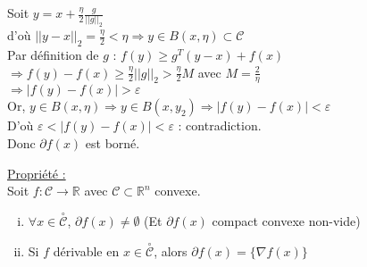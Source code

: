 \documentclass[12pt,a4paper]{article}
\begin{document}
Soit $y = x + \frac{\eta}{2} \frac{g}{||g||_2}$\\
d'où $||y - x||_2 = \frac{\eta}{2} < \eta \Rightarrow y \in B(x, \eta) \subset \mathcal{C}$\\

Par définition de $g$ : $f(y) \geq g^T(y - x) + f(x)$\\
$\Rightarrow f(y) - f(x) \geq \frac{\eta}{2} ||g||_2 > \frac{\eta}{2} M$ avec $M = \frac{2}{\eta}$\\
$\Rightarrow |f(y) - f(x)| > \varepsilon$\\

Or, $y \in B(x, \eta) \Rightarrow y \in B(x, y_2) \Rightarrow |f(y) - f(x)| < \varepsilon$\\

D'où $\varepsilon < |f(y) - f(x)| < \varepsilon$ : contradiction.\\

Donc $\partial f(x)$ est borné.\\

\color{black}

\underline{Propriété :}\\
Soit $f : \mathcal{C} \rightarrow \mathbb{R}$ avec $\mathcal{C} \subset \mathbb{R}^n$ convexe.
\begin{enumerate}[i)]
    \item $\forall x \in \overset{\circ}{\mathcal{C}}$, $\partial f(x) \neq \emptyset$ (Et $\partial f(x)$ compact convexe non-vide)
    \item Si $f$ dérivable en $x \in \overset{\circ}{\mathcal{C}}$, alors $\partial f(x) = \{\nabla f(x)\}$
\end{enumerate}

\color{blue}
\end{document}
